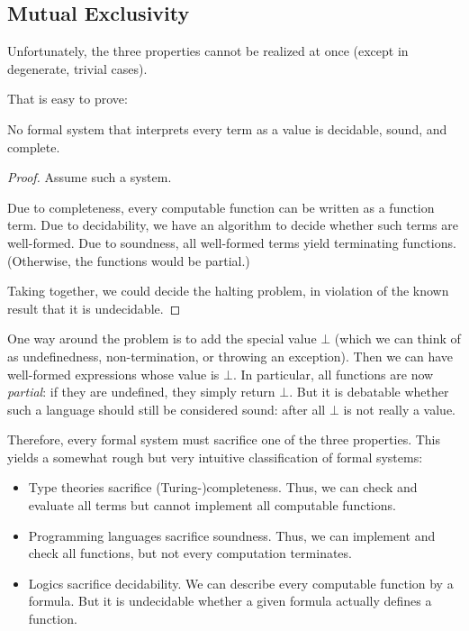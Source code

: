 \subsection{Mutual Exclusivity}

Unfortunately, the three properties cannot be realized at once (except in degenerate, trivial cases).

That is easy to prove:
\begin{theorem}
No formal system that interprets every term as a value is decidable, sound, and complete.
\end{theorem}
\begin{proof}
Assume such a system.

Due to completeness, every computable function can be written as a function term.
Due to decidability, we have an algorithm to decide whether such terms are well-formed.
Due to soundness, all well-formed terms yield terminating functions. (Otherwise, the functions would be partial.)

Taking together, we could decide the halting problem, in violation of the known result that it is undecidable.
\end{proof}

\begin{remark}
One way around the problem is to add the special value $\bot$ (which we can think of as undefinedness, non-termination, or throwing an exception).
Then we can have well-formed expressions whose value is $\bot$.
In particular, all functions are now \emph{partial}: if they are undefined, they simply return $\bot$.
But it is debatable whether such a language should still be considered sound: after all $\bot$ is not really a value.
\end{remark}

Therefore, every formal system must sacrifice one of the three properties.
This yields a somewhat rough but very intuitive classification of formal systems:
\begin{itemize}
 \item Type theories sacrifice (Turing-)completeness. Thus, we can check and evaluate all terms but cannot implement all computable functions.
 \item Programming languages sacrifice soundness. Thus, we can implement and check all functions, but not every computation terminates.
 \item Logics sacrifice decidability. We can describe every computable function by a formula. But it is undecidable whether a given formula actually defines a function.
\end{itemize}

